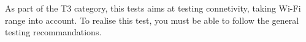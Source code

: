 \begin{itshape}
As part of the T3 category, this tests aims at testing connetivity, taking Wi-Fi range into account.
To realise this test, you must be able to follow the general testing recommandations.
\end{itshape}
\newline
